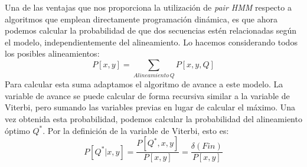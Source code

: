 Una de las ventajas que nos proporciona la utilización de \textit{pair HMM} respecto a algoritmos que emplean directamente programación dinámica, es que ahora podemos calcular la probabilidad de que dos secuencias estén relacionadas según el modelo, independientemente del alineamiento. Lo hacemos considerando todos los posibles alineamientos:
\[P[x,y]=\sum_{Alineamiento\, Q}P[x,y,Q]\]
Para calcular esta suma adaptamos el algoritmo de avance a este modelo. La variable de avance se puede calcular de forma recursiva similar a la variable de Viterbi, pero sumando las variables previas en lugar de calcular el máximo. Una vez obtenida esta probabilidad, podemos calcular la probabilidad del alineamiento óptimo $Q^*$. Por la definición de la variable de Viterbi, esto es:
\[P[Q^*|x,y]=\dfrac{P[Q^*, x,y]}{P[x,y]}=\dfrac{\delta(Fin)}{P[x,y]}\]

